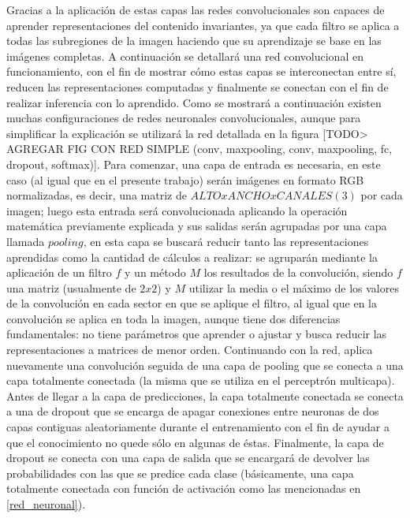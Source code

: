Gracias a la aplicación de estas capas las redes convolucionales son capaces de aprender representaciones del contenido invariantes, ya que cada filtro se aplica a todas las subregiones de la imagen haciendo que su aprendizaje se base en las imágenes completas. A continuación se detallará una red convolucional en funcionamiento, con el fin de mostrar cómo estas capas se interconectan entre sí, reducen las representaciones computadas y finalmente se conectan con el fin de realizar inferencia con lo aprendido. Como se mostrará a continuación existen muchas configuraciones de redes neuronales convolucionales, aunque para simplificar la explicación se utilizará la red detallada en la figura [TODO> AGREGAR FIG CON RED SIMPLE (conv, maxpooling, conv, maxpooling, fc, dropout, softmax)]. Para comenzar, una capa de entrada es necesaria, en este caso (al igual que en el presente trabajo) serán imágenes en formato RGB normalizadas, es decir, una matriz de \(ALTO x ANCHO x CANALES(3)\) por cada imagen; luego esta entrada será convolucionada aplicando la operación matemática previamente explicada y sus salidas serán agrupadas por una capa llamada \(pooling\), en esta capa se buscará reducir tanto las representaciones aprendidas como la cantidad de cálculos a realizar: se agruparán mediante la aplicación de un filtro \(f\) y un método \(M\) los resultados de la convolución, siendo \(f\) una matriz (usualmente de \(2 x 2\)) y \(M\) utilizar la media o el máximo de los valores de la convolución en cada sector en que se aplique el filtro, al igual que en la convolución se aplica en toda la imagen, aunque tiene dos diferencias fundamentales: no tiene parámetros que aprender o ajustar y busca reducir las representaciones a matrices de menor orden. Continuando con la red, aplica nuevamente una convolución seguida de una capa de pooling que se conecta a una capa totalmente conectada (la misma que se utiliza en el perceptrón multicapa). Antes de llegar a la capa de predicciones, la capa totalmente conectada se conecta a una de dropout que se encarga de apagar conexiones entre neuronas de dos capas contiguas aleatoriamente durante el entrenamiento con el fin de ayudar a que el conocimiento no quede sólo en algunas de éstas. Finalmente, la capa de dropout se conecta con una capa de salida que se encargará de devolver las probabilidades con las que se predice cada clase (básicamente, una capa totalmente conectada con función de activación como las mencionadas en \ref{red_neuronal}).

